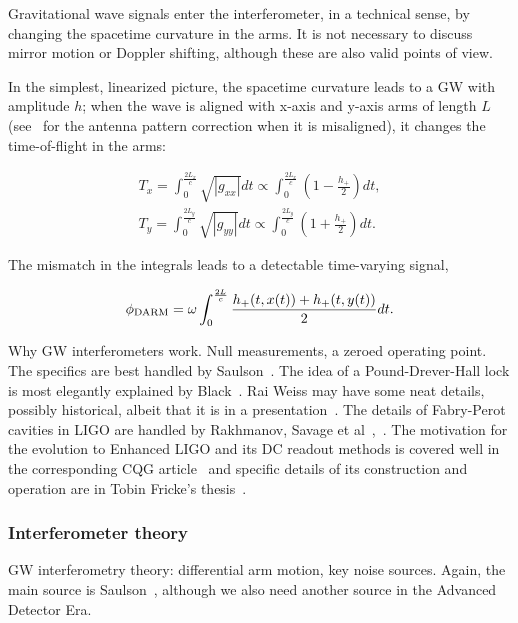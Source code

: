 Gravitational wave signals enter the interferometer, in a technical sense, by changing the spacetime curvature in the arms. It is not necessary to discuss mirror motion or Doppler shifting, although these are also valid points of view. 

In the simplest, linearized picture, the spacetime curvature leads to a GW with amplitude $h$; when the wave is aligned with x-axis and y-axis arms of length $L$ (see~\cite{Jaranowski1998} for the antenna pattern correction when it is misaligned), it changes the time-of-flight in the arms:

\begin{eqnarray}
T_x = \int_0^{\frac{2L_x}{c}} \sqrt{|g_{xx}|} dt \propto \int_0^{\frac{2L_x}{c}} \left(1 - \frac{h_+}{2} \right) dt, \\
T_y = \int_0^{\frac{2L_y}{c}} \sqrt{|g_{yy}|} dt \propto \int_0^{\frac{2L_y}{c}} \left(1 + \frac{h_+}{2} \right) dt.
\end{eqnarray}

\noindent The mismatch in the integrals leads to a detectable time-varying signal,

\begin{equation}
\phi_{\textup{DARM}} = \omega \int_0^{\frac{2L}{c}} \frac{h_+ (t, x(t)) + h_+ (t, y(t))}{2} dt.
\end{equation}  



            Why GW interferometers work. Null measurements, a zeroed operating point. The specifics are best handled by Saulson~\cite{Saulson}. The idea of a Pound-Drever-Hall lock is most elegantly explained by Black~\cite{PDHNotes}. Rai Weiss may have some neat details, possibly historical, albeit that it is in a presentation~\cite{LIGOWorks}. The details of Fabry-Perot cavities in LIGO are handled by Rakhmanov, Savage et al~\cite{ResonanceFP},~\cite{ResponsesFP}. The motivation for the evolution to Enhanced LIGO and its DC readout methods is covered well in the corresponding CQG article~\cite{Fricke2009} and specific details of its construction and operation are in Tobin Fricke's thesis~\cite{FrickeThesis}.

            \subsubsection{Interferometer theory}
            \label{interferometer_theory}
        
                GW interferometry theory: differential arm motion, key noise sources. Again, the main source is Saulson~\cite{Saulson}, although we also need another source in the Advanced Detector Era.

